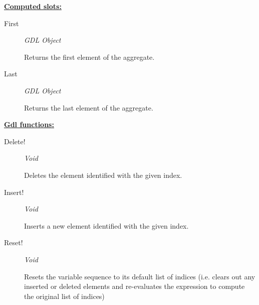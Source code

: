 \documentclass [11pt]{book}
\begin{document}
\begin{itemize}
\begin{description}
\end{description}








\textbf{
\underline{Computed slots:}}

\begin{description}

\item [First]
\emph{GDL Object}

 Returns the first element of the aggregate.




\item [Last]
\emph{GDL Object}

 Returns the last element of the aggregate.




\end{description}






\textbf{
\underline{Gdl functions:}}

\begin{description}

\item [Delete!]
\emph{Void}

 Deletes the element identified with the given index.




\item [Insert!]
\emph{Void}

 Inserts a new element identified with the given index.




\item [Reset!]
\emph{Void}

 Resets the variable sequence to its default list of indices (i.e. clears out any inserted or deleted elements and
re-evaluates the expression to compute the original list of indices)




\end{description}







\end{itemize}
\end{document}

